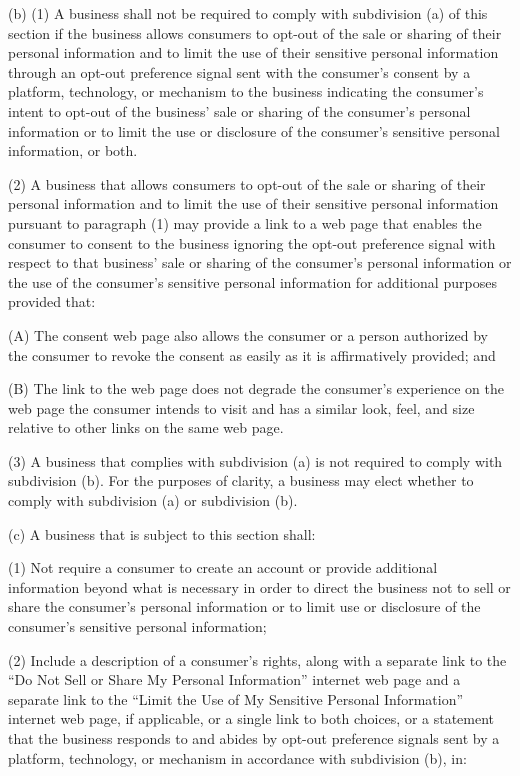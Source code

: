 (b) (1) A business shall not be required to comply with subdivision (a) of this section if the business allows consumers to opt-out of the sale or sharing of their personal information and to limit the use of their sensitive personal information through an opt-out preference signal sent with the consumer’s consent by a platform, technology, or mechanism to the business indicating the consumer’s intent to opt-out of the business’ sale or sharing of the consumer’s personal information or to limit the use or disclosure of the consumer’s sensitive personal information, or both.

(2) A business that allows consumers to opt-out of the sale or sharing of their personal information and to limit the use of their sensitive personal information pursuant to paragraph (1) may provide a link to a web page that enables the consumer to consent to the business ignoring the opt-out preference signal with respect to that business’ sale or sharing of the consumer’s personal information or the use of the consumer’s sensitive personal information for additional purposes provided that:

(A) The consent web page also allows the consumer or a person authorized by the consumer to revoke the consent as easily as it is affirmatively provided; and

(B) The link to the web page does not degrade the consumer’s experience on the web page the consumer intends to visit and has a similar look, feel, and size relative to other links on the same web page.

(3) A business that complies with subdivision (a) is not required to comply with subdivision (b). For the purposes of clarity, a business may elect whether to comply with subdivision (a) or subdivision (b).

(c) A business that is subject to this section shall:

(1) Not require a consumer to create an account or provide additional information beyond what is necessary in order to direct the business not to sell or share the consumer’s personal information or to limit use or disclosure of the consumer’s sensitive personal information;

(2) Include a description of a consumer’s rights, along with a separate link to the “Do Not Sell or Share My Personal Information” internet web page and a separate link to the “Limit the Use of My Sensitive Personal Information” internet web page, if applicable, or a single link to both choices, or a statement that the business responds to and abides by opt-out preference signals sent by a platform, technology, or mechanism in accordance with subdivision (b), in:

